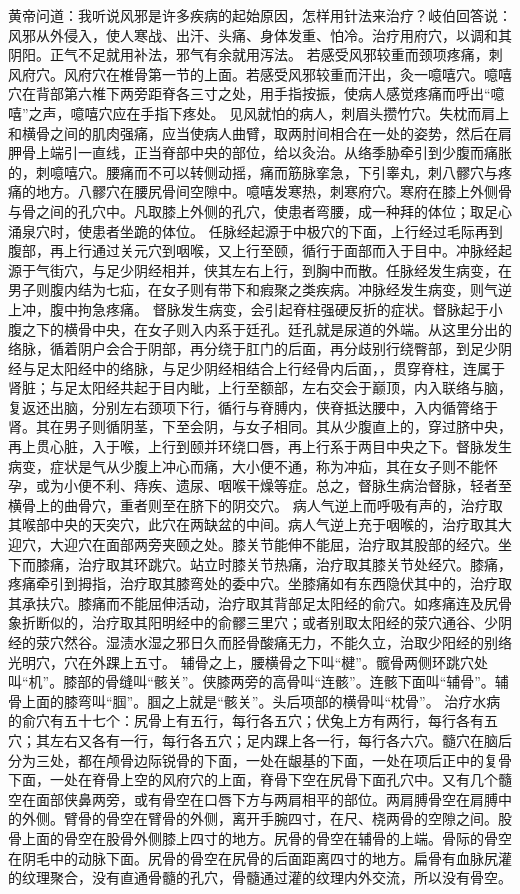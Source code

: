 \documentclass[a4paper,12pt,UTF8,twoside]{ctexbook}
\begin{document}
黄帝问道：我听说风邪是许多疾病的起始原因，怎样用针法来治疗？岐伯回答说：风邪从外侵入，使人寒战、出汗、头痛、身体发重、怕冷。治疗用府穴，以调和其阴阳。正气不足就用补法，邪气有余就用泻法。
若感受风邪较重而颈项疼痛，刺风府穴。风府穴在椎骨第一节的上面。若感受风邪较重而汗出，灸一噫嘻穴。噫嘻穴在背部第六椎下两旁距脊各三寸之处，用手指按振，使病人感觉疼痛而呼出“噫嘻”之声，噫嘻穴应在手指下疼处。
见风就怕的病人，刺眉头攒竹穴。失枕而肩上和横骨之间的肌肉强痛，应当使病人曲臂，取两肘间相合在一处的姿势，然后在肩胛骨上端引一直线，正当脊部中央的部位，给以灸治。从络季胁牵引到少腹而痛胀的，刺噫嘻穴。腰痛而不可以转侧动摇，痛而筋脉挛急，下引睾丸，刺八髎穴与疼痛的地方。八髎穴在腰尻骨间空隙中。噫嘻发寒热，刺寒府穴。寒府在膝上外侧骨与骨之间的孔穴中。凡取膝上外侧的孔穴，使患者弯腰，成一种拜的体位；取足心涌泉穴时，使患者坐跪的体位。
任脉经起源于中极穴的下面，上行经过毛际再到腹部，再上行通过关元穴到咽喉，又上行至颐，循行于面部而入于目中。冲脉经起源于气街穴，与足少阴经相并，侠其左右上行，到胸中而散。任脉经发生病变，在男子则腹内结为七疝，在女子则有带下和瘕聚之类疾病。冲脉经发生病变，则气逆上冲，腹中拘急疼痛。
督脉发生病变，会引起脊柱强硬反折的症状。督脉起于小腹之下的横骨中央，在女子则入内系于廷孔。廷孔就是尿道的外端。从这里分出的络脉，循着阴户会合于阴部，再分绕于肛门的后面，再分歧别行绕臀部，到足少阴经与足太阳经中的络脉，与足少阴经相结合上行经骨内后面，，贯穿脊柱，连属于肾脏；与足太阳经共起于目内眦，上行至额部，左右交会于巅顶，内入联络与脑，复返还出脑，分别左右颈项下行，循行与脊膊内，侠脊抵达腰中，入内循膂络于肾。其在男子则循阴茎，下至会阴，与女子相同。其从少腹直上的，穿过脐中央，再上贯心脏，入于喉，上行到颐并环绕口唇，再上行系于两目中央之下。督脉发生病变，症状是气从少腹上冲心而痛，大小便不通，称为冲疝，其在女子则不能怀孕，或为小便不利、痔疾、遗尿、咽喉干燥等症。总之，督脉生病治督脉，轻者至横骨上的曲骨穴，重者则至在脐下的阴交穴。
病人气逆上而呼吸有声的，治疗取其喉部中央的天突穴，此穴在两缺盆的中间。病人气逆上充于咽喉的，治疗取其大迎穴，大迎穴在面部两旁夹颐之处。膝关节能伸不能屈，治疗取其股部的经穴。坐下而膝痛，治疗取其环跳穴。站立时膝关节热痛，治疗取其膝关节处经穴。膝痛，疼痛牵引到拇指，治疗取其膝弯处的委中穴。坐膝痛如有东西隐伏其中的，治疗取其承扶穴。膝痛而不能屈伸活动，治疗取其背部足太阳经的俞穴。如疼痛连及尻骨象折断似的，治疗取其阳明经中的俞髎三里穴；或者别取太阳经的荥穴通谷、少阴经的荥穴然谷。湿渍水湿之邪日久而胫骨酸痛无力，不能久立，治取少阳经的别络光明穴，穴在外踝上五寸。
辅骨之上，腰横骨之下叫“楗”。髋骨两侧环跳穴处叫“机”。膝部的骨缝叫“骸关”。侠膝两旁的高骨叫“连骸”。连骸下面叫“辅骨”。辅骨上面的膝弯叫“腘”。腘之上就是“骸关”。头后项部的横骨叫“枕骨”。
治疗水病的俞穴有五十七个：尻骨上有五行，每行各五穴；伏兔上方有两行，每行各有五穴；其左右又各有一行，每行各五穴；足内踝上各一行，每行各六穴。髓穴在脑后分为三处，都在颅骨边际锐骨的下面，一处在龈基的下面，一处在项后正中的复骨下面，一处在脊骨上空的风府穴的上面，脊骨下空在尻骨下面孔穴中。又有几个髓空在面部侠鼻两旁，或有骨空在口唇下方与两肩相平的部位。两肩膊骨空在肩膊中的外侧。臂骨的骨空在臂骨的外侧，离开手腕四寸，在尺、桡两骨的空隙之间。股骨上面的骨空在股骨外侧膝上四寸的地方。尻骨的骨空在辅骨的上端。骨际的骨空在阴毛中的动脉下面。尻骨的骨空在尻骨的后面距离四寸的地方。扁骨有血脉尻灌的纹理聚合，没有直通骨髓的孔穴，骨髓通过灌的纹理内外交流，所以没有骨空。
\end{document}

